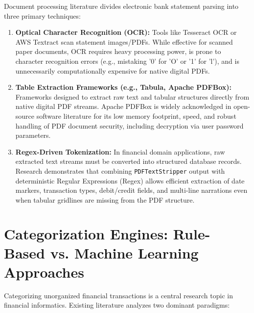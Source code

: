 \documentclass[../Project-Report-Main.tex]{subfiles}
\begin{document}
Document processing literature divides electronic bank statement parsing into three primary techniques:

\begin{enumerate}
 \item \textbf{Optical Character Recognition (OCR):} Tools like Tesseract OCR or AWS Textract scan statement images/PDFs. While effective for scanned paper documents, OCR requires heavy processing power, is prone to character recognition errors (e.g., mistaking '0' for 'O' or '1' for 'l'), and is unnecessarily computationally expensive for native digital PDFs.

 \item \textbf{Table Extraction Frameworks (e.g., Tabula, Apache PDFBox):} Frameworks designed to extract raw text and tabular structures directly from native digital PDF streams. Apache PDFBox is widely acknowledged in open-source software literature for its low memory footprint, speed, and robust handling of PDF document security, including decryption via user password parameters.

 \item \textbf{Regex-Driven Tokenization:} In financial domain applications, raw extracted text streams must be converted into structured database records. Research demonstrates that combining \texttt{PDFTextStripper} output with deterministic Regular Expressions (Regex) allows efficient extraction of date markers, transaction types, debit/credit fields, and multi-line narrations even when tabular gridlines are missing from the PDF structure.
\end{enumerate}

\section{Categorization Engines: Rule-Based vs. Machine Learning Approaches}

Categorizing unorganized financial transactions is a central research topic in financial informatics. Existing literature analyzes two dominant paradigms:
\end{document}
